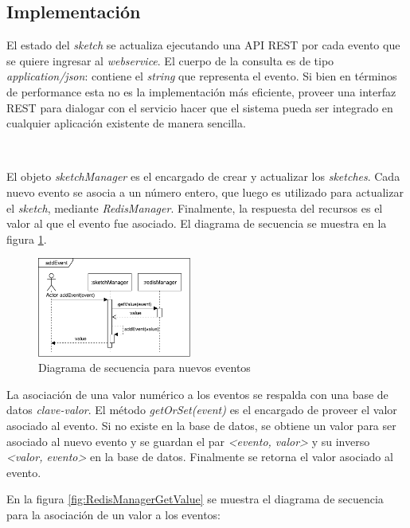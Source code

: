 \documentclass[a4paper,10pt, oneside]{article}
\begin{document}
\subsection*{Implementación}

El estado del \textit{sketch} se actualiza ejecutando una API REST por cada evento que se quiere ingresar al \textit{webservice}. El cuerpo de la consulta es de tipo \textit{application/json}\cite{rfc4627}: contiene el \textit{string} que representa el evento. Si bien en términos de performance esta no es la implementación más eficiente, proveer una interfaz REST para dialogar con el servicio hacer que el sistema pueda ser integrado en cualquier aplicación existente de manera sencilla. 

\

El objeto \textit{sketchManager} es el encargado de crear y actualizar los \textit{sketches}. Cada nuevo evento se asocia a un número entero, que luego es utilizado para actualizar el \textit{sketch}, mediante \textit{RedisManager}. Finalmente, la respuesta del recursos es el valor al que el evento fue asociado. El diagrama de secuencia se muestra en la figura \ref{fig:SecDiagResourceAddEvent}.

\begin{figure}[htbp]
	\centering
	\includegraphics[width=0.45\textwidth]{graph/SecDiag-resourceAddEvent.pdf}
	\caption{Diagrama de secuencia para nuevos eventos}
	\label{fig:SecDiagResourceAddEvent}
\end{figure}

La asociación de una valor numérico a los eventos se respalda con una base de datos \textit{clave-valor}. El método \textit{getOrSet(event)} es el encargado de proveer el valor asociado al evento. Si no existe en la base de datos, se obtiene un valor para ser asociado al nuevo evento y se guardan el par \textit{<evento, valor>} y su inverso \textit{<valor, evento>} en la base de datos. Finalmente se retorna el valor asociado al evento.

En la figura \ref{fig:RedisManagerGetValue} se muestra el diagrama de secuencia para la asociación de un valor a los eventos:
\end{document}
